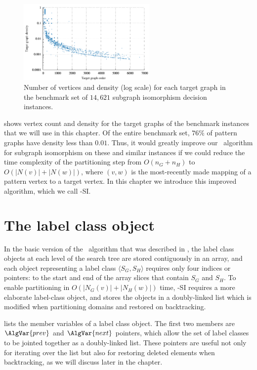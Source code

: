 \begin{figure}[htb]
    \centering
    \includegraphics*[width=0.6\textwidth]{14b-mcsplit-induced-si/density-chart/plots/n-density-pdf}
    \caption{Number of vertices and density (log scale) for each target graph in the benchmark set
    of $14,621$ subgraph isomorphism decision instances.}
    \label{figure:si-targets-n-density}
\end{figure}

 shows vertex count and density for the target graphs of the benchmark instances
that we will use in this chapter.  Of the entire benchmark set, $76\%$ of pattern graphs have density less than $0.01$.  Thus, it would
greatly improve our \McSplit\ algorithm for subgraph isomorphism on these and similar instances if we could reduce the time complexity of the partitioning
step from $O(n_G + n_H)$ to $O(|N(v)| + |N(w)|)$, where $(v,w)$ is the most-recently made mapping of a pattern vertex to a target
vertex.  In this chapter we introduce this improved algorithm, which we call \McSplit-SI.

\FloatBarrier

\section{The label class object}

In the basic version of the \McSplit\ algorithm that was described in
, the label class objects at each level of the search tree are stored
contiguously in an array, and each object representing
a label class $\langle S_G, S_H \rangle$ requires only four indices or pointers: to the start and
end of the array slices that contain $S_G$ and $S_H$.
To enable partitioning in $O(|N_G(v)| + |N_H(w)|)$ time, \McSplit-SI
requires a more elaborate label-class object, and stores the objects in a doubly-linked list which is modified
when partitioning domains and restored on backtracking.

 lists the member variables of a label class object.
The first two members are $\AlgVar{prev}$ and $\AlgVar{next}$ pointers, which
allow the set of label classes to be jointed together as a doubly-linked list.
These pointers are useful not only for iterating over the list but also
for restoring deleted elements when backtracking, as we will discuss later in the chapter.

